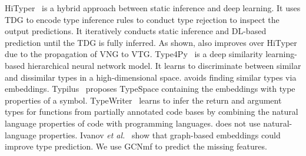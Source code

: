 \vspace{1pt}
HiTyper~\cite{HiTyper-icse22} is a hybrid approach between static
inference and deep learning. It uses TDG to encode type inference
rules to conduct type rejection to inspect the output predictions. It
iteratively conducts static inference and DL-based prediction until
the TDG is fully inferred.
As shown, {\tool} also improves over HiTyper due to the propagation of
VNG to VTG.
%
Type4Py~\cite{Type4Py-icse22} is a deep similarity learning-based
hierarchical neural network model. It learns to discriminate between
similar and dissimilar types in a high-dimensional space.
{\tool} avoids finding similar types via embeddings.
Typilus~\cite{typilus-pldi20} proposes TypeSpace
containing the embeddings with type properties of a
symbol. TypeWriter~\cite{typewriter-fse20} learns to infer the return
and argument types for functions from partially annotated code bases
by combining the natural language properties of code with programming
languages. {\tool} does not use natural-language
properties. Ivanov {\em et al.}~\cite{ivanov21predicting} show
that graph-based embeddings could improve type
prediction. We use GCNmf to predict the missing features.



